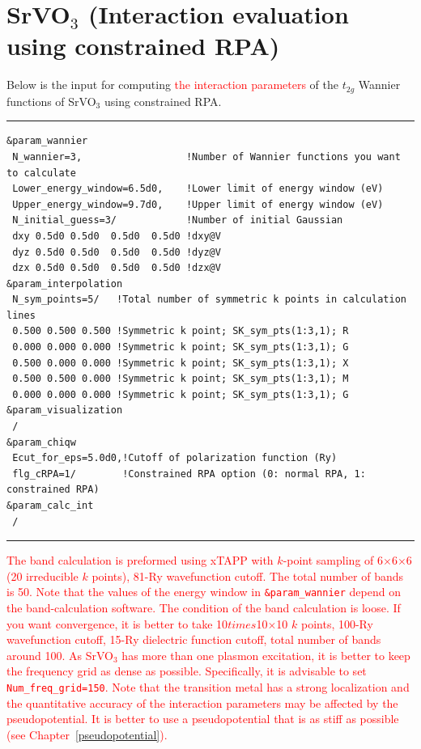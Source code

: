 \documentclass{article}
\newcommand{\tr}[1]{\textcolor{red}{#1}}
\begin{document}
\clearpage 

\section{\label{SrVO3}SrVO$_3$ (Interaction evaluation using constrained RPA)} 

Below is the input for computing \tr{the interaction parameters} of the $t_{2g}$ Wannier functions of SrVO$_3$ using constrained RPA.
\vspace{3mm}\hrule
\begin{verbatim}
&param_wannier 
 N_wannier=3,                  !Number of Wannier functions you want to calculate
 Lower_energy_window=6.5d0,    !Lower limit of energy window (eV)
 Upper_energy_window=9.7d0,    !Upper limit of energy window (eV)
 N_initial_guess=3/            !Number of initial Gaussian
 dxy 0.5d0 0.5d0  0.5d0  0.5d0 !dxy@V
 dyz 0.5d0 0.5d0  0.5d0  0.5d0 !dyz@V
 dzx 0.5d0 0.5d0  0.5d0  0.5d0 !dzx@V
&param_interpolation   
 N_sym_points=5/   !Total number of symmetric k points in calculation lines
 0.500 0.500 0.500 !Symmetric k point; SK_sym_pts(1:3,1); R 
 0.000 0.000 0.000 !Symmetric k point; SK_sym_pts(1:3,1); G 
 0.500 0.000 0.000 !Symmetric k point; SK_sym_pts(1:3,1); X 
 0.500 0.500 0.000 !Symmetric k point; SK_sym_pts(1:3,1); M 
 0.000 0.000 0.000 !Symmetric k point; SK_sym_pts(1:3,1); G 
&param_visualization   
 / 
&param_chiqw
 Ecut_for_eps=5.0d0,!Cutoff of polarization function (Ry)
 flg_cRPA=1/        !Constrained RPA option (0: normal RPA, 1: constrained RPA)
&param_calc_int 
 /
\end{verbatim}
\hrule\vspace{3mm}
\tr{The band calculation is preformed using {\sc xTAPP} with $k$-point sampling of 6$\times$6$\times$6 (20 irreducible $k$ points), 81-Ry wavefunction cutoff. The total number of bands is 50. Note that the values of the energy window in {\tt \&param\_wannier} depend on the band-calculation software. The condition of the band calculation is loose. If you want convergence, it is better to take 10$times$10$\times$10 $k$ points, 100-Ry wavefunction cutoff, 15-Ry dielectric function cutoff, total number of bands around 100. As SrVO$_3$ has more than one plasmon excitation, it is better to keep the frequency grid as dense as possible. Specifically, it is advisable to set {\tt Num\_freq\_grid=150}. Note that the transition metal has a strong localization and the quantitative accuracy of the interaction parameters may be affected by the pseudopotential. It is better to use a pseudopotential that is as stiff as possible (see Chapter~\ref{pseudopotential}).}  
\end{document}
